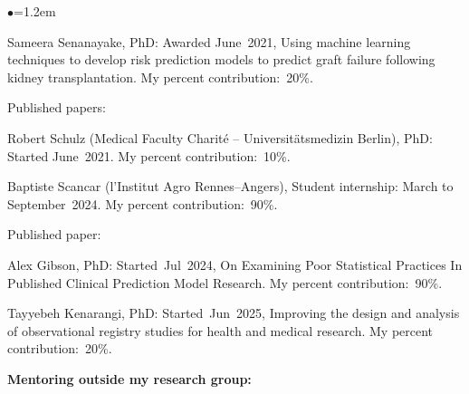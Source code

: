\documentclass[a4paper,11pt]{article}
\renewcommand{\labelitemi}{$\bullet$}
\begin{document}
\begin{raggedright}
\begin{list}{\labelitemi}{\leftmargin=1.2em}
\item Sameera Senanayake, PhD: Awarded June~2021, Using machine learning techniques to develop risk prediction models to predict graft failure following kidney transplantation. My percent contribution:~20\%.

Published papers: 

% 


% 
\item Robert Schulz (Medical Faculty Charit\'{e} – Universit\"{a}tsmedizin Berlin), PhD: Started June~2021. My percent contribution:~10\%.

% 
\item Baptiste Scancar (l'Institut Agro Rennes--Angers), Student internship: March to September~2024. My percent contribution:~90\%.

Published paper: 

\item Alex Gibson, PhD: Started~Jul~2024, On Examining Poor Statistical Practices In Published Clinical Prediction Model Research. My percent contribution:~90\%.

\item Tayyebeh Kenarangi, PhD: Started~Jun~2025, Improving the design and analysis of observational registry studies for health and medical research. My percent contribution:~20\%.


\end{list}

\textbf{Mentoring outside my research group:}


\end{raggedright}
\end{document}
